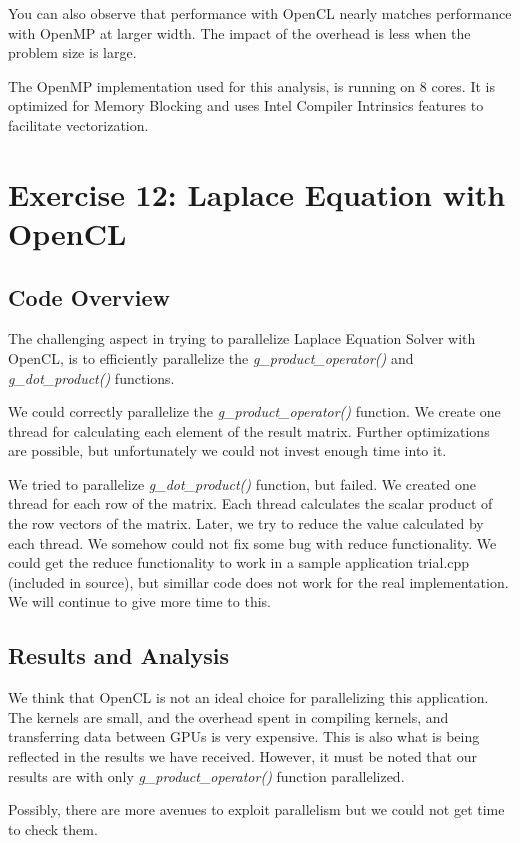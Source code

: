 \documentclass[]{scrartcl}
\begin{document}
You can also observe that performance with OpenCL nearly matches performance with OpenMP at larger width. The impact of the overhead
is less when the problem size is large.

The OpenMP implementation used for this analysis, is running on 8 cores. It is optimized for Memory Blocking and uses Intel
Compiler Intrinsics features to facilitate vectorization.

\pagebreak
\section{Exercise 12: Laplace Equation with OpenCL}

\subsection{Code Overview}
The challenging aspect in trying to parallelize Laplace Equation Solver with OpenCL, is to efficiently parallelize the 
\textit{g\_product\_operator()} and \textit{g\_dot\_product()} functions.

We could correctly parallelize the \textit{g\_product\_operator()} function. We create one thread for calculating each element
of the result matrix. Further optimizations are possible, but unfortunately we could not invest enough time into it.

We tried to parallelize \textit{g\_dot\_product()} function, but failed. We created one thread for each row of the matrix. Each
thread calculates the scalar product of the row vectors of the matrix. Later, we try to reduce the value calculated by each
thread. We somehow could not fix some bug with reduce functionality. We could get the reduce functionality to work in a sample
application trial.cpp (included in source), but simillar code does not work for the real implementation. We will continue to give
more time to this.

\subsection{Results and Analysis}
We think that OpenCL is not an ideal choice for parallelizing this application. The kernels are small, and the overhead spent
in compiling kernels, and transferring data between GPUs is very expensive. This is also what is being reflected in the results we
have received. However, it must be noted that our results are with only \textit{g\_product\_operator()} function parallelized. 

Possibly, there are more avenues to exploit parallelism but we could not get time to check them.
\end{document}
